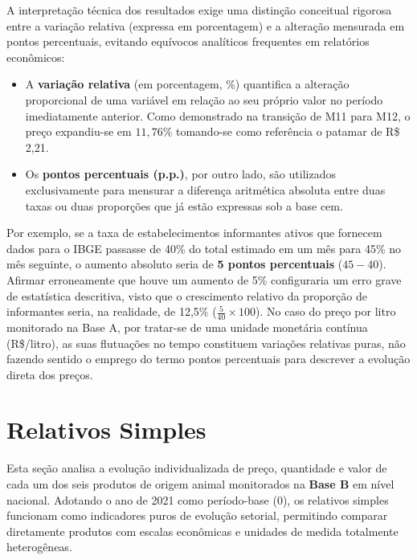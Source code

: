 \documentclass[12pt,a4paper]{article}
\begin{document}
A interpretação técnica dos resultados exige uma distinção conceitual rigorosa entre a variação relativa (expressa em porcentagem) e a alteração mensurada em pontos percentuais, evitando equívocos analíticos frequentes em relatórios econômicos:
\begin{itemize}
    \item A \textbf{variação relativa} (em porcentagem, \%) quantifica a alteração proporcional de uma variável em relação ao seu próprio valor no período imediatamente anterior. Como demonstrado na transição de M11 para M12, o preço expandiu-se em $11,76\%$ tomando-se como referência o patamar de R\$ 2,21.
    \item Os \textbf{pontos percentuais (p.p.)}, por outro lado, são utilizados exclusivamente para mensurar a diferença aritmética absoluta entre duas taxas ou duas proporções que já estão expressas sob a base cem. 
\end{itemize}

Por exemplo, se a taxa de estabelecimentos informantes ativos que fornecem dados para o IBGE passasse de 40\% do total estimado em um mês para 45\% no mês seguinte, o aumento absoluto seria de \textbf{5 pontos percentuais} ($45 - 40$). Afirmar erroneamente que houve um aumento de 5\% configuraria um erro grave de estatística descritiva, visto que o crescimento relativo da proporção de informantes seria, na realidade, de 12,5\% ($\frac{5}{40} \times 100$). No caso do preço por litro monitorado na Base A, por tratar-se de uma unidade monetária contínua (R\$/litro), as suas flutuações no tempo constituem variações relativas puras, não fazendo sentido o emprego do termo pontos percentuais para descrever a evolução direta dos preços.

\section{Relativos Simples}
\label{sec:relativos_simples}

Esta seção analisa a evolução individualizada de preço, quantidade e valor de cada um dos seis produtos de origem animal monitorados na \textbf{Base B} em nível nacional. Adotando o ano de 2021 como período-base ($0$), os relativos simples funcionam como indicadores puros de evolução setorial, permitindo comparar diretamente produtos com escalas econômicas e unidades de medida totalmente heterogêneas.
\end{document}
